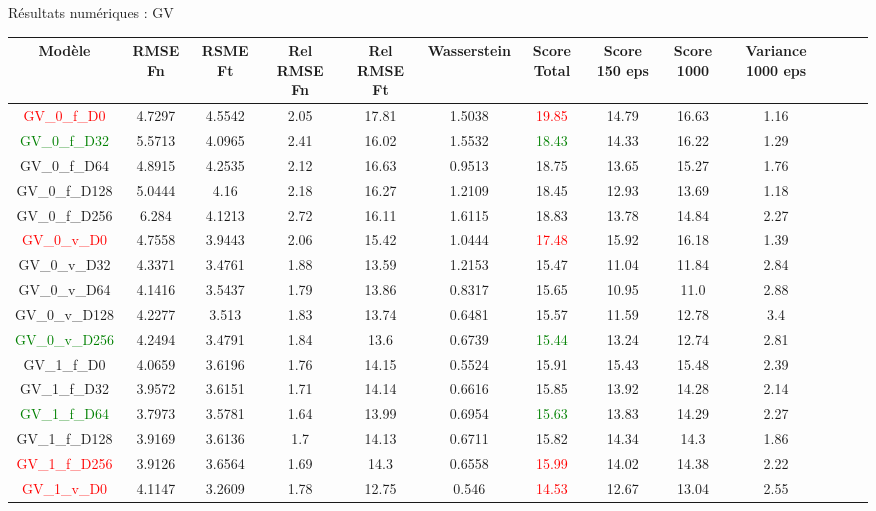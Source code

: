 \documentclass[
11pt,notheorems,hyperref={pdfauthor=whatever}
]{beamer}
\begin{document}
\begin{frame}{Résultats numériques : GV}        
    \tiny
    \begin{tabular}{| c | c c c c c c c c c c c c | }
        \hline
        Modèle & RMSE Fn & RSME Ft & Rel RMSE Fn & Rel RMSE Ft & Wasserstein & Score Total & Score 150 eps & Score 1000 & Variance 1000 eps \\
        \hline
        \textcolor{red}{GV\_0\_f\_D0} &4.7297	&4.5542	&2.05	&17.81	&1.5038	&\textcolor{red}{19.85}	&14.79	&16.63	&1.16 \\
        \textcolor{green}{GV\_0\_f\_D32}&5.5713	&4.0965	&2.41	&16.02	&1.5532	&\textcolor{green}{18.43}	&14.33	&16.22	&1.29\\
        GV\_0\_f\_D64&4.8915	&4.2535	&2.12	&16.63	&0.9513	&18.75	&13.65	&15.27	&1.76 \\
        GV\_0\_f\_D128&5.0444	&4.16	&2.18	&16.27	&1.2109	&18.45	&12.93	&13.69	&1.18	\\
        GV\_0\_f\_D256&6.284	&4.1213	&2.72	&16.11	&1.6115	&18.83	&13.78	&14.84	&2.27 \\
        \hline
        \textcolor{red}{GV\_0\_v\_D0}  &4.7558	&3.9443	&2.06	&15.42	&1.0444	&\textcolor{red}{17.48}	&15.92	&16.18	&1.39 \\
        GV\_0\_v\_D32 &4.3371	&3.4761	&1.88	&13.59	&1.2153	&15.47	&11.04	&11.84	&2.84\\
        GV\_0\_v\_D64 &4.1416	&3.5437	&1.79	&13.86	&0.8317	&15.65	&10.95	&11.0	&2.88	\\
        GV\_0\_v\_D128&4.2277	&3.513	&1.83	&13.74	&0.6481	&15.57	&11.59	&12.78	&3.4\\
        \textcolor{green}{GV\_0\_v\_D256}&4.2494	&3.4791	&1.84	&13.6	&0.6739	&\textcolor{green}{15.44}	&13.24	&12.74	&2.81 \\
        \hline
        GV\_1\_f\_D0&4.0659	&3.6196	&1.76	&14.15	&0.5524	&15.91	&15.43	&15.48	&2.39 \\
        GV\_1\_f\_D32	&3.9572	&3.6151	&1.71	&14.14	&0.6616	&15.85	&13.92	&14.28	&2.14 \\
        \textcolor{green}{GV\_1\_f\_D64}	&3.7973	&3.5781	&1.64	&13.99	&0.6954	&\textcolor{green}{15.63}	&13.83	&14.29	&2.27 \\
        GV\_1\_f\_D128	&3.9169	&3.6136	&1.7	&14.13	&0.6711	&15.82	&14.34	&14.3	&1.86 \\
        \textcolor{red}{GV\_1\_f\_D256}	&3.9126	&3.6564	&1.69	&14.3	&0.6558	&\textcolor{red}{15.99}	&14.02	&14.38	&2.22 \\
        \hline
        \textcolor{red}{GV\_1\_v\_D0}  &4.1147	&3.2609	&1.78	&12.75	&0.546	&\textcolor{red}{14.53}	&12.67	&13.04	&2.55 \\

\end{tabular}
\end{frame}
\end{document}
